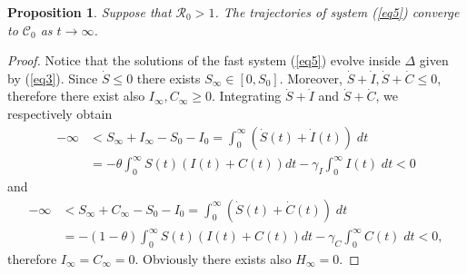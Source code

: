\documentclass[11pt,reqno]{amsart}
\newtheorem{proposition}{Proposition}
\theoremstyle{boldremark}
\begin{document}
\begin{proposition}
    Suppose that $\mathcal{R}_0>1$. The trajectories of system (\ref{eq5}) converge to $\mathcal{C}_0$ as $t \to \infty$. 
\end{proposition}
\begin{proof}
    Notice that the solutions of the fast system (\ref{eq5}) evolve inside $\Delta$ given by (\ref{eq3}). Since $\dot{S} \le 0$ there exists $S_\infty \in [0, S_0]$. Moreover, $\dot{S}+\dot{I}, \dot{S}+\dot{C} \le 0$, therefore there exist also $I_\infty, C_\infty \ge 0$. Integrating $\dot{S}+\dot{I}$ and $\dot{S}+\dot{C}$, we respectively obtain 
    \begin{equation*}
    \begin{split}
        - \infty & < S_\infty + I_\infty - S_0 - I_0 = \int_0^\infty \left(\dot{S}(t)+\dot{I}(t)\right) \; dt \\ 
        & = -\theta \int_0^\infty S(t) \left(I(t)+C(t)\right) dt - \gamma_I \int_0^\infty I(t) \; dt < 0
    \end{split}
    \end{equation*}
    and 
    \begin{equation*}
    \begin{split}
        - \infty & < S_\infty + C_\infty - S_0 - I_0 = \int_0^\infty \left(\dot{S}(t)+\dot{C}(t)\right) \; dt \\ 
        & = -(1-\theta) \int_0^\infty S(t) \left(I(t)+C(t)\right) dt - \gamma_C \int_0^\infty C(t) \; dt < 0, 
    \end{split}
    \end{equation*}
    therefore $I_\infty=C_\infty=0$. Obviously there exists also $H_\infty=0$. 
\end{proof} 
\end{document}
